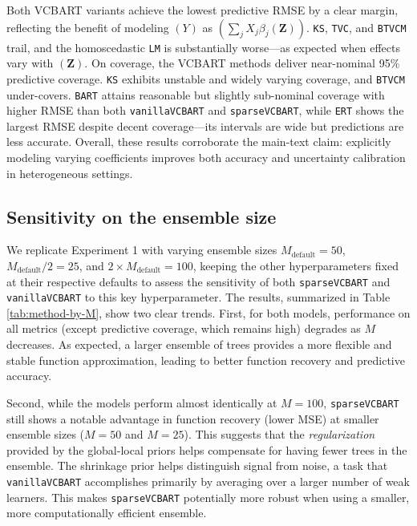 \documentclass[11pt]{article}
\theoremstyle{plain}
\theoremstyle{definition}
\theoremstyle{plain}
\begin{document}
Both VCBART variants achieve the lowest predictive RMSE by a clear margin, reflecting the benefit of modeling $(Y)$ as $(\sum_j X_j \beta_j(\bm{Z}))$. \texttt{KS}, \texttt{TVC}, and \texttt{BTVCM} trail, and the homoscedastic \texttt{LM} is substantially worse—as expected when effects vary with $(\bm{Z})$. On coverage, the VCBART methods deliver near-nominal 95\% predictive coverage. \texttt{KS} exhibits unstable and widely varying coverage, and \texttt{BTVCM} under-covers. \texttt{BART} attains reasonable but slightly sub-nominal coverage with higher RMSE than both \texttt{vanillaVCBART} and \texttt{sparseVCBART}, while \texttt{ERT} shows the largest RMSE despite decent coverage—its intervals are wide but predictions are less accurate. Overall, these results corroborate the main-text claim: explicitly modeling varying coefficients improves both accuracy and uncertainty calibration in heterogeneous settings.

\subsection{Sensitivity on the ensemble size}\label{sec:sensitivity}
We replicate Experiment 1 with varying ensemble sizes $M_{\textrm{default}}=50$, $M_{\textrm{default}}/2=25$, and $2 \times M_{\textrm{default}}=100$, keeping the other hyperparameters fixed at their respective defaults to assess the sensitivity of both \texttt{sparseVCBART} and \texttt{vanillaVCBART} to this key hyperparameter. The results, summarized in Table \ref{tab:method-by-M}, show two clear trends. First, for both models, performance on all metrics (except predictive coverage, which remains high) degrades as $M$ decreases. As expected, a larger ensemble of trees provides a more flexible and stable function approximation, leading to better function recovery and predictive accuracy.

Second, while the models perform almost identically at $M=100$, \texttt{sparseVCBART} still shows a notable advantage in function recovery (lower MSE) at smaller ensemble sizes ($M=50$ and $M=25$). This suggests that the \emph{regularization} provided by the global-local priors helps compensate for having fewer trees in the ensemble. The shrinkage prior helps distinguish signal from noise, a task that \texttt{vanillaVCBART} accomplishes primarily by averaging over a larger number of weak learners. This makes \texttt{sparseVCBART} potentially more robust when using a smaller, more computationally efficient ensemble.
\end{document}

